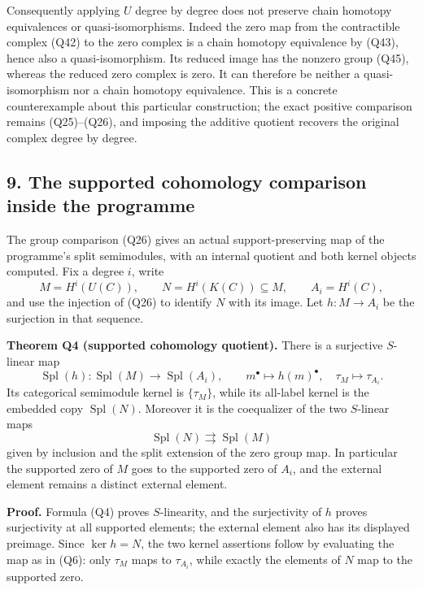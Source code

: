 \documentclass[
]{article}
\begin{document}
Consequently applying \(U\) degree by degree does not preserve chain
homotopy equivalences or quasi-isomorphisms. Indeed the zero map from
the contractible complex (Q42) to the zero complex is a chain homotopy
equivalence by (Q43), hence also a quasi-isomorphism. Its reduced image
has the nonzero group (Q45), whereas the reduced zero complex is zero.
It can therefore be neither a quasi-isomorphism nor a chain homotopy
equivalence. This is a concrete counterexample about this particular
construction; the exact positive comparison remains (Q25)--(Q26), and
imposing the additive quotient recovers the original complex degree by
degree.

\subsection{9. The supported cohomology comparison inside the
programme}\label{the-supported-cohomology-comparison-inside-the-programme}

The group comparison (Q26) gives an actual support-preserving map of the
programme's split semimodules, with an internal quotient and both kernel
objects computed. Fix a degree \(i\), write \[
M=H^i(U(C)),\qquad N=H^i(K(C))\subseteq M,
\qquad A_i=H^i(C),
\tag{Q48}
\] and use the injection of (Q26) to identify \(N\) with its image. Let
\(h:M\to A_i\) be the surjection in that sequence.

\textbf{Theorem Q4 (supported cohomology quotient).} There is a
surjective \(S\)-linear map \[
\operatorname{Spl}(h):\operatorname{Spl}(M)
\longrightarrow\operatorname{Spl}(A_i),
\qquad m^\bullet\longmapsto h(m)^\bullet,
\quad\tau_M\longmapsto\tau_{A_i}.
\tag{Q49}
\] Its categorical semimodule kernel is \(\{\tau_M\}\), while its
all-label kernel is the embedded copy \(\operatorname{Spl}(N)\).
Moreover it is the coequalizer of the two \(S\)-linear maps \[
\operatorname{Spl}(N)\rightrightarrows\operatorname{Spl}(M)
\tag{Q50}
\] given by inclusion and the split extension of the zero group map. In
particular the supported zero of \(M\) goes to the supported zero of
\(A_i\), and the external element remains a distinct external element.

\textbf{Proof.} Formula (Q4) proves \(S\)-linearity, and the
surjectivity of \(h\) proves surjectivity at all supported elements; the
external element also has its displayed preimage. Since \(\ker h=N\),
the two kernel assertions follow by evaluating the map as in (Q6): only
\(\tau_M\) maps to \(\tau_{A_i}\), while exactly the elements of \(N\)
map to the supported zero.
\end{document}
